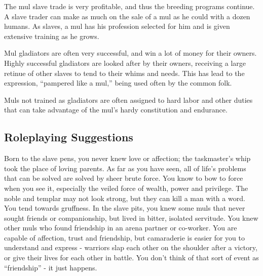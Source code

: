 The mul slave trade is very profitable, and thus the breeding programs continue. A slave trader can make as much on the sale of a mul as he could with a dozen humans. As slaves, a mul has his profession selected for him and is given extensive training as he grows.

Mul gladiators are often very successful, and win a lot of money for their owners. Highly successful gladiators are looked after by their owners, receiving a large retinue of other slaves to tend to their whims and needs. This has lead to the expression, ``pampered like a mul,'' being used often by the common folk.

Muls not trained as gladiators are often assigned to hard labor and other duties that can take advantage of the mul's hardy constitution and endurance.

\subsection{Roleplaying Suggestions}
Born to the slave pens, you never knew love or affection; the taskmaster's whip took the place of loving parents. As far as you have seen, all of life's problems that can be solved are solved by sheer brute force. You know to bow to force when you see it, especially the veiled force of wealth, power and privilege. The noble and templar may not look strong, but they can kill a man with a word. You tend towards gruffness. In the slave pits, you knew some muls that never sought friends or companionship, but lived in bitter, isolated servitude. You knew other muls who found friendship in an arena partner or co-worker. You are capable of affection, trust and friendship, but camaraderie is easier for you to understand and express - warriors slap each other on the shoulder after a victory, or give their lives for each other in battle. You don't think of that sort of event as ``friendship'' - it just happens.

